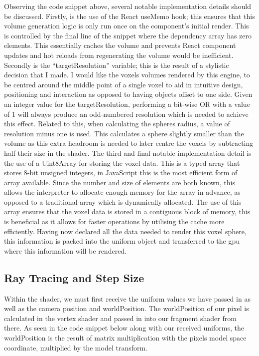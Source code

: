 \documentclass[titlepage]{article}
\begin{document}


Observing the code snippet above, several notable implementation details should be discussed. Firstly, is the use of the React useMemo hook; this ensures that this volume generation logic is only run once on the component's initial render. This is controlled by the final line of the snippet where the dependency array has zero elements. This essentially caches the volume and prevents React component updates and hot reloads from regenerating the volume would be inefficient. Secondly is the ``targetResolution'' variable; this is the result of a stylistic decision that I made. I would like the voxels volumes rendered by this engine, to be centred around the middle point of a single voxel to aid in intuitive design, positioning and interaction as opposed to having objects offset to one side. Given an integer value for the targetResolution, performing a bit-wise OR with a value of 1 will always produce an odd-numbered resolution which is needed to achieve this effect. Related to this, when calculating the spheres radius, a value of resolution minus one is used. This calculates a sphere slightly smaller than the volume as this extra headroom is needed to later centre the voxels by subtracting half their size in the shader. The third and final notable implementation detail is the use of a Uint8Array for storing the voxel data. This is a typed array that stores 8-bit unsigned integers, in JavaScript this is the most efficient form of array available. Since the number and size of elements are both known, this allows the interpreter to allocate enough memory for the array in advance, as opposed to a traditional array which is dynamically allocated. The use of this array ensures that the voxel data is stored in a contiguous block of memory, this is beneficial as it allows for faster operations by utilising the cache more efficiently. Having now declared all the data needed to render this voxel sphere, this information is packed into the uniform object and transferred to the \gls{gpu} where this information will be rendered.

\subsection{Ray Tracing and Step Size}

Within the shader, we must first receive the uniform values we have passed in as well as the camera position and worldPosition. The worldPosition of our pixel is calculated in the vertex shader and passed in into our fragment shader from there. As seen in the code snippet below along with our received uniforms, the worldPosition is the result of matrix multiplication with the pixels model space coordinate, multiplied by the model transform.
\end{document}
